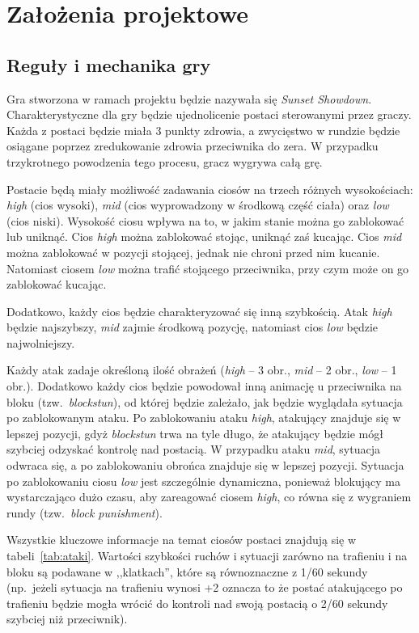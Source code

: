 \chapter{Założenia projektowe}
\section{Reguły i mechanika gry}
Gra stworzona w ramach projektu będzie nazywała się \emph{Sunset Showdown}. Charakterystyczne dla gry będzie ujednolicenie postaci sterowanymi przez graczy. Każda z postaci będzie miała 3 punkty zdrowia, a zwycięstwo w rundzie będzie osiągane poprzez zredukowanie zdrowia przeciwnika do zera. W przypadku trzykrotnego powodzenia tego procesu, gracz wygrywa całą grę. 

Postacie będą miały możliwość zadawania ciosów na trzech różnych wysokościach: \emph{high} (cios wysoki), \emph{mid} (cios wyprowadzony w środkową część ciała) oraz \emph{low} (cios niski). Wysokość ciosu wpływa na to, w jakim stanie można go zablokować lub uniknąć. Cios \emph{high} można zablokować stojąc, uniknąć zaś kucając. Cios \emph{mid} można zablokować w pozycji stojącej, jednak nie chroni przed nim kucanie. Natomiast ciosem \emph{low} można trafić stojącego przeciwnika, przy czym może on go zablokować kucając. 

Dodatkowo, każdy cios będzie charakteryzować się inną szybkością. Atak \emph{high} będzie najszybszy, \emph{mid} zajmie środkową pozycję, natomiast cios \emph{low} będzie najwolniejszy. 

Każdy atak zadaje określoną ilość obrażeń (\emph{high} -- 3 obr., \emph{mid} -- 2 obr., \emph{low} -- 1 obr.). Dodatkowo każdy cios będzie powodował inną animację u przeciwnika na bloku (tzw.~\emph{blockstun}), od której będzie zależało, jak będzie wyglądała sytuacja po zablokowanym ataku. Po zablokowaniu ataku \emph{high}, atakujący znajduje się w lepszej pozycji, gdyż \emph{blockstun} trwa na tyle długo, że atakujący będzie mógł szybciej odzyskać kontrolę nad postacią. W przypadku ataku \emph{mid}, sytuacja odwraca się, a po zablokowaniu obrońca znajduje się w lepszej pozycji. Sytuacja po zablokowaniu ciosu \emph{low} jest szczególnie dynamiczna, ponieważ blokujący ma wystarczająco dużo czasu, aby zareagować ciosem \emph{high}, co równa się z wygraniem rundy (tzw.~\emph{block punishment}).

Wszystkie kluczowe informacje na temat ciosów postaci znajdują się w tabeli~\ref{tab:ataki}. Wartości szybkości ruchów i sytuacji zarówno na trafieniu i na bloku są podawane w ,,klatkach'', które są równoznaczne z 1/60 sekundy (np.\ jeżeli sytuacja na trafieniu wynosi +2 oznacza to że postać atakującego po trafieniu będzie mogła wrócić do kontroli nad swoją postacią o 2/60 sekundy szybciej niż przeciwnik).

